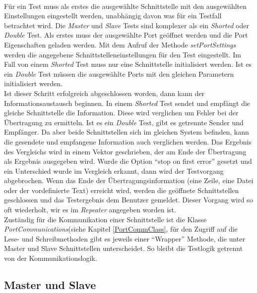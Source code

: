 \paragraph{}
Für ein Test muss als erstes die ausgewählte Schnittstelle mit den ausgewählten Einstellungen eingestellt werden, unabhängig davon was für ein Testfall betrachtet wird. Die \textit{Master} und \textit{Slave} Tests sind komplexer als ein \textit{Shorted} oder \textit{Double} Test. Als erstes muss der ausgewählte Port geöffnet werden und die Port Eigenschaften geladen werden. Mit dem Aufruf der Methode \textit{setPortSettings} werden die angegebene Schnittstelleneinstellungen für den Test eingestellt. Im Fall von einem \textit{Shorted} Test muss nur eine Schnittstelle initialisiert werden. Ist es ein \textit{Double} Test müssen die ausgewählte Ports mit den gleichen Parametern initialisiert werden.\\

Ist dieser Schritt erfolgreich abgeschlossen worden, dann kann der Informationsaustausch beginnen. In einem \textit{Shorted} Test sendet und empfängt die gleiche Schnittstelle die Information. Diese wird verglichen um Fehler bei der Übertragung zu ermitteln. Ist es ein \textit{Double} Test, gibt es getrennte Sender und Empfänger. Da aber beide Schnittstellen sich im gleichen System befinden, kann die gesendete und empfangene Information auch verglichen werden. Das Ergebnis des Vergleichs wird in einem Vektor geschrieben, der am Ende der Übertragung als Ergebnis ausgegeben wird. Wurde die Option "`stop on first error"' gesetzt und ein Unterschied wurde im Vergleich erkannt, dann wird der Testvorgang abgebrochen. Wenn das Ende der Übertragungsinformation (eine Zeile, eine Datei oder der vordefinierte Text) erreicht wird, werden die geöffnete Schnittstellen geschlossen und das Testergebnis dem Benutzer gemeldet. Dieser Vorgang wird so oft wiederholt, wir es im \textit{Repeater} angegeben worden ist.\\

Zuständig für die Kommunikation einer Schnittstelle ist die Klasse \textit{PortCommunications}(siehe Kapitel \ref{PortCommClass}, für den Zugriff auf die Lese- und Schreibmethoden gibt es jeweils einer "`Wrapper"' Methode, die unter Master und Slave Schnittstellen unterscheidet. So bleibt die Testlogik getrennt von der Kommunikationslogik.

\subsection{Master und Slave}
